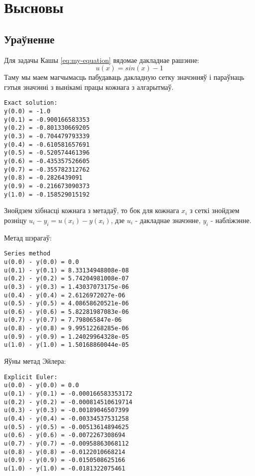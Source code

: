 \section*{Высновы}

\subsection*{Ураўненне}

Для задачы Кашы \eqref{eq:my-equation} вядомае дакладнае рашэнне:
\begin{equation}
    u(x) = sin(x) - 1
\end{equation}
Таму мы маем магчымасць пабудаваць дакладную сетку значэнняў і параўнаць гэтыя значэнні з вынікамі працы кожнага з алгарытмаў.

{\small
\begin{verbatim}
Exact solution:
y(0.0) = -1.0
y(0.1) = -0.900166583353
y(0.2) = -0.801330669205
y(0.3) = -0.704479793339
y(0.4) = -0.610581657691
y(0.5) = -0.520574461396
y(0.6) = -0.435357526605
y(0.7) = -0.355782312762
y(0.8) = -0.2826439091
y(0.9) = -0.216673090373
y(1.0) = -0.158529015192
\end{verbatim}
}

Знойдзем хібнасці кожнага з метадаў, то бок для кожнага $x_i$ з сеткі знойдзем розніцу $u_i - y_i = u(x_i) - y(x_i)$, дзе $u_i$ - дакладнае значэнне, $y_i$ - набліжэнне.\par
\vspace{5mm}
Метад шэрагаў:
{\small
\begin{verbatim}
Series method
u(0.0) - y(0.0) = 0.0
u(0.1) - y(0.1) = 8.33134948808e-08
u(0.2) - y(0.2) = 5.74204981008e-07
u(0.3) - y(0.3) = 1.43037073175e-06
u(0.4) - y(0.4) = 2.6126972027e-06
u(0.5) - y(0.5) = 4.08658620521e-06
u(0.6) - y(0.6) = 5.82281987083e-06
u(0.7) - y(0.7) = 7.798065847e-06
u(0.8) - y(0.8) = 9.99512268285e-06
u(0.9) - y(0.9) = 1.24029964328e-05
u(1.0) - y(1.0) = 1.50168860044e-05
\end{verbatim}
}

Яўны метад Эйлера:
{\small
\begin{verbatim}
Explicit Euler:
u(0.0) - y(0.0) = 0.0
u(0.1) - y(0.1) = -0.000166583353172
u(0.2) - y(0.2) = -0.000814510619714
u(0.3) - y(0.3) = -0.00189046507399
u(0.4) - y(0.4) = -0.00334537531258
u(0.5) - y(0.5) = -0.00513614894625
u(0.6) - y(0.6) = -0.0072267308694
u(0.7) - y(0.7) = -0.00958863068112
u(0.8) - y(0.8) = -0.0122010668214
u(0.9) - y(0.9) = -0.0150508625166
u(1.0) - y(1.0) = -0.0181322075461
\end{verbatim}
}

